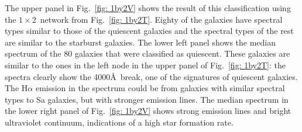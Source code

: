             
            The upper panel in Fig.~\ref{fig: 1by2V} shows the result of this classification using the $1\times2$~network from Fig.~\ref{fig: 1by2T}.
            Eighty of the galaxies have spectral types similar to those of the quiescent galaxies and the spectral types of the rest are similar to the starburst galaxies.
            The lower left panel shows the median spectrum of the 80 galaxies that were classified as quiescent. 
            These galaxies are similar to the ones in the left node in the upper panel of Fig.~\ref{fig: 1by2T}:
            the spectra clearly show the 4000\AA~break, one of the signatures of quiescent galaxies.
            The H$\alpha$ emission in the spectrum could be from galaxies with similar spectral types to Sa galaxies, but with stronger emission lines.
            The median spectrum in the lower right panel of Fig.~\ref{fig: 1by2V} shows strong emission lines and bright ultraviolet continuum, indications of a high star formation rate.
